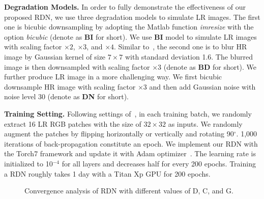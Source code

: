 \documentclass[10pt,twocolumn,letterpaper]{article}
\begin{document}
\textbf{Degradation Models.} In order to fully demonstrate the effectiveness of our proposed RDN, we use three degradation models to simulate LR images. The first one is bicubic downsampling by adopting the Matlab function \textit{imresize} with the option \textit{bicubic} (denote as \textbf{BI} for short). We use \textbf{BI} model to simulate LR images with scaling factor $\times2$, $\times3$, and $\times4$. Similar to~\cite{zhang2017learning}, the second one is to blur HR image by Gaussian kernel of size $7\times7$ with standard deviation 1.6. The blurred image is then downsampled with scaling factor $\times3$ (denote as \textbf{BD} for short). We further produce LR image in a more challenging way. We first bicubic downsample HR image with scaling factor $\times3$ and then add Gaussian noise with noise level 30 (denote as \textbf{DN} for short). 

\textbf{Training Setting.}
Following settings of~\cite{lim2017enhanced}, in each training batch, we randomly extract 16 LR RGB patches with the size of $32\times32$ as inputs. We randomly augment the patches by flipping horizontally or vertically and rotating 90$^{\circ}$. 1,000 iterations of back-propagation constitute an epoch. We implement our RDN with the Torch7 framework and update it with Adam optimizer~\cite{kingma2014adam}. The learning rate is initialized to 10$^{-4}$ for all layers and decreases half for every 200 epochs. Training a RDN roughly takes 1 day with a Titan Xp GPU for 200 epochs.
\vspace{-4mm}
\begin{figure}[htbp]
\scriptsize
\centering
\centerline{
}
\vspace{-1mm}
\caption{Convergence analysis of RDN with different values of D, C, and G.}  
\label{fig:study_D_C_G}
\vspace{-4mm}
\end{figure}
\end{document}
